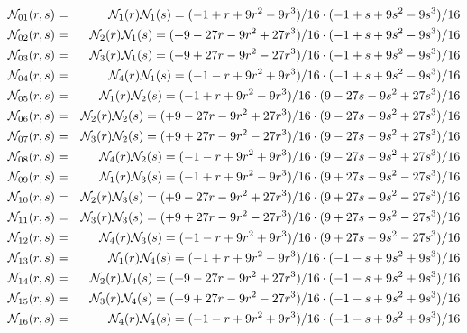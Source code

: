 \begin{mdframed}[backgroundcolor=blue!5]
\begin{eqnarray}
{\mathcal{N}}_{01}(r,s)&=&{\mathcal{N}}_1(r){\mathcal{N}}_1(s) = (-1   +r +9r^2 - 9r^3)/16 \cdot (-1  +s +9s^2 - 9s^3)/16 \nonumber\\
{\mathcal{N}}_{02}(r,s)&=&{\mathcal{N}}_2(r){\mathcal{N}}_1(s) = (+9 -27r -9r^2 +27r^3)/16 \cdot (-1  +s +9s^2 - 9s^3)/16 \nonumber\\
{\mathcal{N}}_{03}(r,s)&=&{\mathcal{N}}_3(r){\mathcal{N}}_1(s) = (+9 +27r -9r^2 -27r^3)/16 \cdot (-1  +s +9s^2 - 9s^3)/16 \nonumber\\
{\mathcal{N}}_{04}(r,s)&=&{\mathcal{N}}_4(r){\mathcal{N}}_1(s) = (-1   -r +9r^2 + 9r^3)/16 \cdot (-1  +s +9s^2 - 9s^3)/16 \nonumber\\
{\mathcal{N}}_{05}(r,s)&=&{\mathcal{N}}_1(r){\mathcal{N}}_2(s) = (-1   +r +9r^2 - 9r^3)/16 \cdot (9 -27s -9s^2 +27s^3)/16 \nonumber\\
{\mathcal{N}}_{06}(r,s)&=&{\mathcal{N}}_2(r){\mathcal{N}}_2(s) = (+9 -27r -9r^2 +27r^3)/16 \cdot (9 -27s -9s^2 +27s^3)/16 \nonumber\\
{\mathcal{N}}_{07}(r,s)&=&{\mathcal{N}}_3(r){\mathcal{N}}_2(s) = (+9 +27r -9r^2 -27r^3)/16 \cdot (9 -27s -9s^2 +27s^3)/16 \nonumber\\
{\mathcal{N}}_{08}(r,s)&=&{\mathcal{N}}_4(r){\mathcal{N}}_2(s) = (-1   -r +9r^2 + 9r^3)/16 \cdot (9 -27s -9s^2 +27s^3)/16 \nonumber\\
{\mathcal{N}}_{09}(r,s)&=&{\mathcal{N}}_1(r){\mathcal{N}}_3(s) = (-1   +r +9r^2 - 9r^3)/16 \cdot (9 +27s -9s^2 -27s^3)/16 \nonumber\\
{\mathcal{N}}_{10}(r,s)&=&{\mathcal{N}}_2(r){\mathcal{N}}_3(s) = (+9 -27r -9r^2 +27r^3)/16 \cdot (9 +27s -9s^2 -27s^3)/16 \nonumber\\
{\mathcal{N}}_{11}(r,s)&=&{\mathcal{N}}_3(r){\mathcal{N}}_3(s) = (+9 +27r -9r^2 -27r^3)/16 \cdot (9 +27s -9s^2 -27s^3)/16 \nonumber\\
{\mathcal{N}}_{12}(r,s)&=&{\mathcal{N}}_4(r){\mathcal{N}}_3(s) = (-1   -r +9r^2 + 9r^3)/16 \cdot (9 +27s -9s^2 -27s^3)/16 \nonumber\\
{\mathcal{N}}_{13}(r,s)&=&{\mathcal{N}}_1(r){\mathcal{N}}_4(s) = (-1   +r +9r^2 - 9r^3)/16 \cdot (-1   -s +9s^2 + 9s^3)/16\nonumber\\
{\mathcal{N}}_{14}(r,s)&=&{\mathcal{N}}_2(r){\mathcal{N}}_4(s) = (+9 -27r -9r^2 +27r^3)/16 \cdot (-1   -s +9s^2 + 9s^3)/16\nonumber\\
{\mathcal{N}}_{15}(r,s)&=&{\mathcal{N}}_3(r){\mathcal{N}}_4(s) = (+9 +27r -9r^2 -27r^3)/16 \cdot (-1   -s +9s^2 + 9s^3)/16\nonumber\\
{\mathcal{N}}_{16}(r,s)&=&{\mathcal{N}}_4(r){\mathcal{N}}_4(s) = (-1   -r +9r^2 + 9r^3)/16 \cdot (-1   -s +9s^2 + 9s^3)/16
\end{eqnarray}
\end{mdframed}

